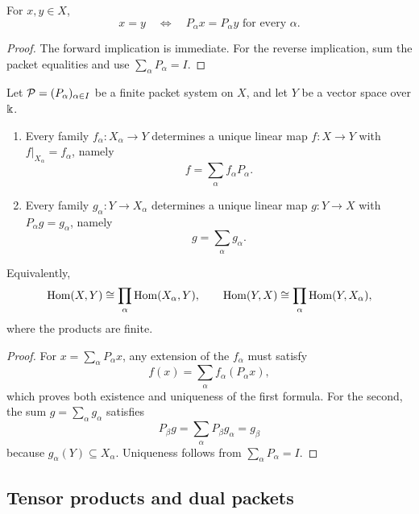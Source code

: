 \begin{corollary}
\label{cor:packetwise-equality}
For $x,y\in X$,
\[
x=y
\quad\Longleftrightarrow\quad
P_\alpha x=P_\alpha y\text{ for every }\alpha.
\]
\end{corollary}

\begin{proof}
The forward implication is immediate.  For the reverse implication, sum the packet equalities and use $\sum_\alpha P_\alpha=I$.
\end{proof}



\begin{corollary}
\label{cor:packet-universal-property}
Let \(\mathcal P=(P_\alpha)_{\alpha\in I}\) be a finite packet system on \(X\), and let \(Y\) be a vector space over \(\Bbbk\).
\begin{enumerate}
\item Every family \(f_\alpha:X_\alpha\to Y\) determines a unique linear map \(f:X\to Y\) with \(f|_{X_\alpha}=f_\alpha\), namely
\[
f=\sum_\alpha f_\alpha P_\alpha.
\]
\item Every family \(g_\alpha:Y\to X_\alpha\) determines a unique linear map \(g:Y\to X\) with \(P_\alpha g=g_\alpha\), namely
\[
g=\sum_\alpha g_\alpha.
\]
\end{enumerate}
Equivalently,
\[
\operatorname{Hom}(X,Y)\cong\prod_\alpha\operatorname{Hom}(X_\alpha,Y),
\qquad
\operatorname{Hom}(Y,X)\cong\prod_\alpha\operatorname{Hom}(Y,X_\alpha),
\]
where the products are finite.
\end{corollary}

\begin{proof}
For \(x=\sum_\alpha P_\alpha x\), any extension of the \(f_\alpha\) must satisfy
\[
f(x)=\sum_\alpha f_\alpha(P_\alpha x),
\]
which proves both existence and uniqueness of the first formula.  For the second, the sum \(g=\sum_\alpha g_\alpha\) satisfies
\[
P_\beta g
=\sum_\alpha P_\beta g_\alpha
=g_\beta
\]
because \(g_\alpha(Y)\subseteq X_\alpha\).  Uniqueness follows from \(\sum_\alpha P_\alpha=I\).
\end{proof}


\subsection{Tensor products and dual packets}

